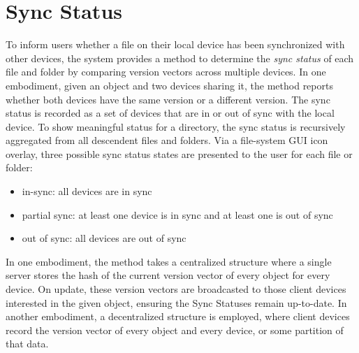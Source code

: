 \section*{Sync Status}

To inform users whether a file on their local device has been synchronized with
other devices, the system provides a method to determine the {\em sync status}
of each file and folder by comparing version vectors across multiple devices. In
one embodiment, given an object and two devices sharing it, the method reports
whether both devices have the same version or a different version. The sync
status is recorded as a set of devices that are in or out of sync with the local
device.
To show meaningful status for a directory, the sync status is recursively
aggregated from all descendent files and folders. Via a file-system GUI icon
overlay, three possible sync status states are presented to the user for each
file or folder:
\begin{itemize}
 \item in-sync: all devices are in sync
 \item partial sync: at least one device is in sync and at least one is out of sync
 \item out of sync: all devices are out of sync
\end{itemize}

In one embodiment, the method takes a centralized structure where a single
server stores the hash of the current version vector of every object for every
device. On update, these version vectors are broadcasted to those client devices
interested in the given object, ensuring the Sync Statuses remain up-to-date. In
another embodiment, a decentralized structure is employed, where client devices
record the version vector of every object and every device, or some partition of
that data.
